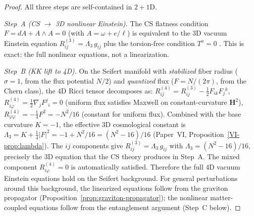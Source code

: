 \begin{proof}
All three steps are self-contained in $2{+}1$D.

\emph{Step~A (CS $\to$ 3D nonlinear Einstein).}
The CS flatness condition $F = dA + A \wedge A = 0$
(with $A = \omega + e/\ell$) is equivalent to the $3$D
vacuum Einstein equation $R^{(3)}_{ij} = \Lambda_3\,g_{ij}$
plus the torsion-free condition $T^a = 0$
\citep{Witten1988}.
This is exact: the full nonlinear equations, not a
linearization.

\emph{Step~B (KK lift to 4D).}
On the Seifert manifold with \emph{stabilized} fiber radius
($\sigma = 1$, from the flux potential $N/2$) and
\emph{quantized} flux ($F = N/(2\pi)$, from the Chern class),
the $4$D Ricci tensor decomposes as:
$R^{(4)}_{ij} = R^{(3)}_{ij} - \frac{1}{2}F_{ik}F_j{}^k$,
$R^{(4)}_{i\varphi} = \frac{1}{2}\nabla_j F^j{}_i = 0$
(uniform flux satisfies Maxwell on constant-curvature $\mathbf{H}^2$),
$R^{(4)}_{\varphi\varphi} = -\tfrac{1}{4}F^2 = -N^2/16$
(constant for uniform flux).
Combined with the base curvature $K = -1$,
the effective $3$D cosmological constant is
$\Lambda_3 = K + \tfrac{1}{4}|F|^2 = -1 + N^2/16
= (N^2{-}16)/16$ (Paper~VI, Proposition~\ref*{VI-prop:lambda}).
The $ij$ components give $R^{(3)}_{ij} = \Lambda_3\,g_{ij}$
with $\Lambda_3 = (N^2 - 16)/16$, precisely the $3$D equation
that the CS theory produces in Step~A.
The mixed component $R^{(4)}_{i\varphi} = 0$ is automatically
satisfied.
Therefore the full $4$D vacuum Einstein equations hold on the
Seifert background.
For general perturbations around this background, the linearized
equations follow from the graviton propagator
(Proposition~\ref{prop:graviton-propagator}); the nonlinear
matter-coupled equations follow from the entanglement argument
(Step~C below).


\end{proof}
